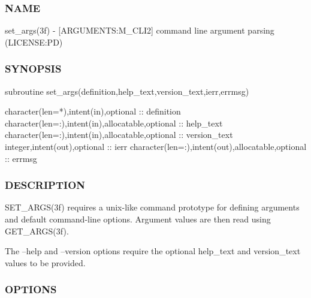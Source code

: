 \subsubsection*{N\+A\+ME}

set\+\_\+args(3f) -\/ \mbox{[}A\+R\+G\+U\+M\+E\+N\+TS\+:M\+\_\+\+C\+L\+I2\mbox{]} command line argument parsing (L\+I\+C\+E\+N\+SE\+:PD) 

\subsubsection*{S\+Y\+N\+O\+P\+S\+IS}

\begin{DoxyVerb} subroutine set_args(definition,help_text,version_text,ierr,errmsg)

  character(len=*),intent(in),optional              :: definition
  character(len=:),intent(in),allocatable,optional  :: help_text
  character(len=:),intent(in),allocatable,optional  :: version_text
  integer,intent(out),optional                      :: ierr
  character(len=:),intent(out),allocatable,optional :: errmsg
\end{DoxyVerb}
 \subsubsection*{D\+E\+S\+C\+R\+I\+P\+T\+I\+ON}

\begin{DoxyVerb} SET_ARGS(3f) requires a unix-like command prototype for defining
 arguments and default command-line options. Argument values are then
 read using GET_ARGS(3f).

 The --help and --version options require the optional
 help_text and version_text values to be provided.
\end{DoxyVerb}


\subsubsection*{O\+P\+T\+I\+O\+NS}

